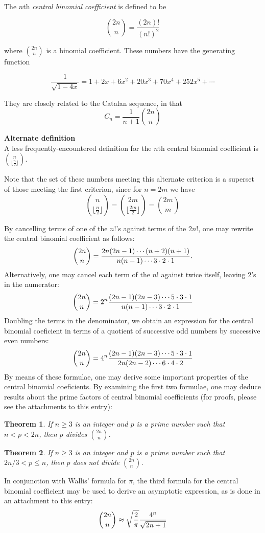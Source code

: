 \documentclass[12pt]{article}
\newtheorem{thm}{Theorem}
\begin{document}
The $n$th {\em central binomial coefficient} is defined to be

\[ {2n \choose n} = \frac{(2n)!}{(n!)^2} \]

where ${2n \choose n}$ is a binomial coefficient.  These numbers have the generating function

\[ \frac{1}{\sqrt{1-4x}} = 1 + 2x + 6x^2 + 20x^3 + 70x^4 + 252x^5 + \cdots \]

They are closely related to the Catalan sequence, in that 
\[ C_n = \frac{1}{n+1} {2n \choose n}  \]

{\bf Alternate definition}\\

A less frequently-encountered definition for the $n$th central binomial coefficient is ${ n \choose {\lfloor \frac{n}{2} \rfloor} }$.

Note that the set of these numbers meeting this alternate criterion is a superset of those meeting the first criterion, since for $n = 2m$ we have
\[ {n \choose {\lfloor \frac{n}{2} \rfloor} } =
   {2m \choose {\lfloor \frac{2m}{2} \rfloor} } = {2m \choose m} \]

By cancelling terms of one of the $n!$'s against terms of the $2n!$, one may rewrite the central binomial 
coefficient as follows:
\[
{2n \choose n} = 
{2n (2n-1) \cdots (n+2) (n+1) \over
 n (n-1) \cdots 3 \cdot 2 \cdot 1}.
\]
Alternatively, one may cancel each term of the $n!$ against twice itself, leaving $2$'s in the numerator:
\[
{2n \choose n} = 
2^n {(2n-1) (2n-3) \cdots 5 \cdot 3 \cdot 1 \over
n (n-1) \cdots 3 \cdot 2 \cdot 1}
\]
Doubling the terms in the denominator, we obtain an expression for the central binomial coeficient
in terms of a quotient of successive odd numbers by successive even numbers:
\[
{2n \choose n} = 4^n
{(2n-1) (2n-3) \cdots 5 \cdot 3 \cdot 1 \over
 2n (2n-2) \cdots 6 \cdot 4 \cdot 2}
\]
By means of these formulae, one may derive some important properties of the central
binomial coeficients.  By examining the first two formulae, one may deduce results
about the prime factors of central binomial coefficients  (for proofs, please see the
attachments to this entry):

\begin{thm}
If $n \ge 3$ is an integer and $p$ is a prime number such that $n < p < 2n$, then
$p$ divides ${2n \choose n}$.
\end{thm}

\begin{thm}
If $n \ge 3$ is an integer and $p$ is a prime number such that $2n/3 < p \le n$, then
$p$ does not divide ${2n \choose n}$.
\end{thm}

In conjunction with Wallis' formula for $\pi$, the third formula for the central
binomial coefficient may be used to derive an asymptotic expression, as is done in
an attachment to this entry:
\[
 {2n \choose n} \approx
 \sqrt{2 \over \pi}
 {4^n \over \sqrt{2n+1}}
\]
\end{document}

